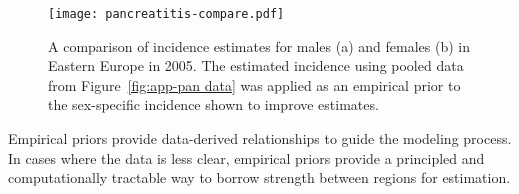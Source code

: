     \begin{figure}[h]
        \begin{center}
            \texttt{[image: pancreatitis-compare.pdf]}
            \caption{A comparison of incidence estimates for males (a) and
              females (b) in Eastern Europe in 2005.  The estimated incidence 
              using pooled data from Figure~\ref{fig:app-pan data} was applied 
              as an empirical prior to the sex-specific incidence shown to 
              improve estimates.}
            \label{fig:app-pan compare}
        \end{center}
    \end{figure}

Empirical priors provide data-derived relationships to guide the
modeling process.  In cases where the data is less clear, empirical
priors provide a principled and computationally tractable way to
borrow strength between regions for estimation.
